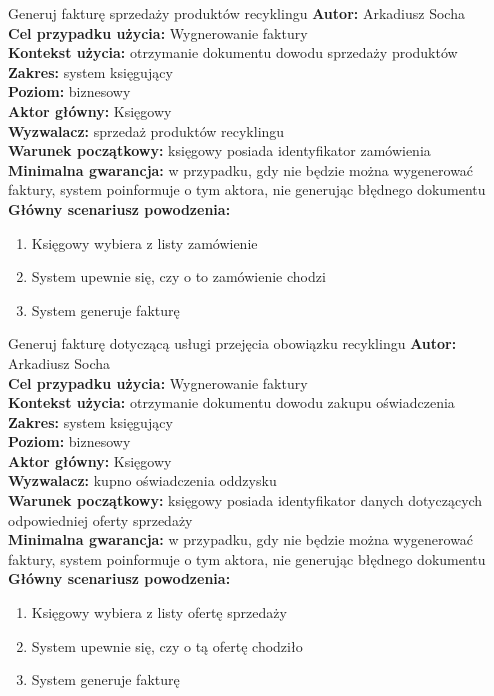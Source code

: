 	\begin{usecase}{Generuj fakturę sprzedaży produktów recyklingu}
		\textbf{Autor:} Arkadiusz Socha\\
		\textbf{Cel przypadku użycia:} Wygnerowanie faktury \\
		\textbf{Kontekst użycia:} otrzymanie dokumentu dowodu sprzedaży produktów  \\
		\textbf{Zakres:} system księgujący \\
		\textbf{Poziom:} biznesowy \\
		\textbf{Aktor główny:} Księgowy \\
		\textbf{Wyzwalacz:} sprzedaż produktów recyklingu \\
		\textbf{Warunek początkowy:} księgowy posiada identyfikator zamówienia \\
		\textbf{Minimalna gwarancja:} w przypadku, gdy nie będzie można wygenerować faktury, system poinformuje o tym aktora, nie generując błędnego dokumentu \\
		\textbf{Główny scenariusz powodzenia:} 
			\begin{enumerate}
				\item Księgowy wybiera z listy zamówienie
				\item System upewnie się, czy o to zamówienie chodzi
				\item System generuje fakturę 
			\end{enumerate}
	\end{usecase}

	\begin{usecase}{Generuj fakturę dotyczącą usługi przejęcia obowiązku recyklingu}
		\textbf{Autor:} Arkadiusz Socha\\
		\textbf{Cel przypadku użycia:} Wygnerowanie faktury \\
		\textbf{Kontekst użycia:} otrzymanie dokumentu dowodu zakupu oświadczenia  \\
		\textbf{Zakres:} system księgujący \\
		\textbf{Poziom:} biznesowy \\
		\textbf{Aktor główny:} Księgowy \\
		\textbf{Wyzwalacz:} kupno oświadczenia oddzysku \\
		\textbf{Warunek początkowy:} księgowy posiada identyfikator danych dotyczących odpowiedniej oferty sprzedaży \\
		\textbf{Minimalna gwarancja:} w przypadku, gdy nie będzie można wygenerować faktury, system poinformuje o tym aktora, nie generując błędnego dokumentu \\
		\textbf{Główny scenariusz powodzenia:} 
			\begin{enumerate}
				\item Księgowy wybiera z listy ofertę sprzedaży
				\item System upewnie się, czy o tą ofertę chodziło
				\item System generuje fakturę 
			\end{enumerate}
	\end{usecase}

